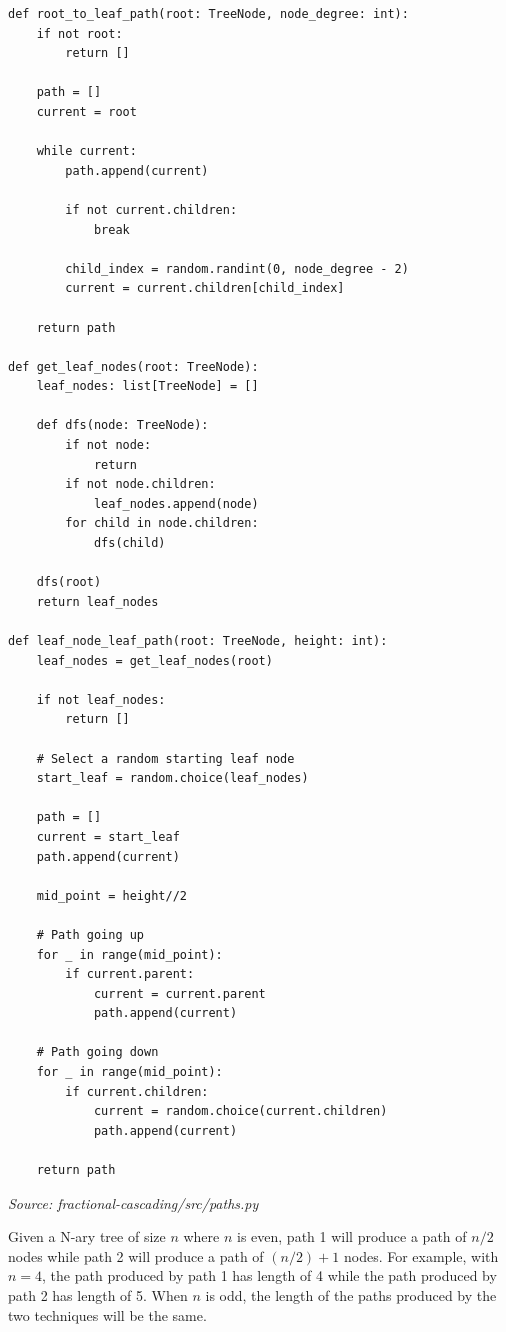 \documentclass[12pt,english,]{article}
\begin{document}
\begin{lstlisting}
def root_to_leaf_path(root: TreeNode, node_degree: int):
    if not root:
        return []
    
    path = []
    current = root

    while current:
        path.append(current)

        if not current.children:
            break

        child_index = random.randint(0, node_degree - 2)
        current = current.children[child_index]

    return path

def get_leaf_nodes(root: TreeNode):
    leaf_nodes: list[TreeNode] = []

    def dfs(node: TreeNode):
        if not node:
            return
        if not node.children:
            leaf_nodes.append(node)
        for child in node.children:
            dfs(child)

    dfs(root)
    return leaf_nodes

def leaf_node_leaf_path(root: TreeNode, height: int):
    leaf_nodes = get_leaf_nodes(root)

    if not leaf_nodes:
        return []
    
    # Select a random starting leaf node
    start_leaf = random.choice(leaf_nodes)

    path = []
    current = start_leaf
    path.append(current)

    mid_point = height//2

    # Path going up
    for _ in range(mid_point):
        if current.parent:
            current = current.parent
            path.append(current)

    # Path going down
    for _ in range(mid_point):
        if current.children:
            current = random.choice(current.children)
            path.append(current)

    return path
\end{lstlisting}
\vspace{-9truemm}
\begin{minipage}{1\textwidth}
  \begin{flushright}
  {\footnotesize \emph{Source: fractional-cascading/src/paths.py }\par}
  \end{flushright}
\end{minipage}
\vspace{0.5truemm}

Given a N-ary tree of size $n$ where $n$ is even, path 1 will produce a path of $n/2$ nodes 
while path 2 will produce a path of $(n/2) +1$ nodes. For example, with $n=4$, the path 
produced by path 1 has length of 4 while the path produced by path 2 has length of 5. When 
$n$ is odd, the length of the paths produced by the two techniques will be the same.
\end{document}
